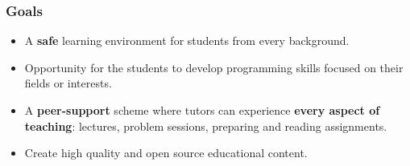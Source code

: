     \begin{frame}
      \frametitle{Goals}
      \Large
      \pause
      \begin{itemize}
        \item A \textbf{safe} learning environment for students from every background.
        \pause
        \item Opportunity for the students to develop programming skills focused on their fields or interests.
        \pause
        \item A \textbf{peer-support} scheme where tutors can experience \textbf{every aspect of teaching}: lectures, problem sessions, preparing and reading assignments.
        \pause
        \item Create high quality and open source educational content.
      \end{itemize}
      
    \end{frame}


